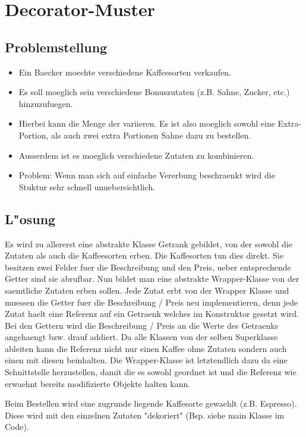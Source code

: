 \section{Decorator-Muster}

\subsection{Problemstellung}
\begin{itemize}
\item Ein Baecker moechte verschiedene Kaffeesorten verkaufen. 
\item Es soll moeglich sein verschiedene Bonuszutaten (z.B. Sahne, Zucker, etc.) hinzuzufuegen. 
\item Hierbei kann die Menge der variieren. Es ist also moeglich sowohl eine Extra-Portion, als auch 
  zwei extra Portionen Sahne dazu zu bestellen. 
\item Ausserdem ist es moeglich verschiedene Zutaten zu kombinieren. 
\item Problem: Wenn man sich auf einfache Vererbung beschraenkt wird die Stuktur sehr schnell 
  unuebersichtlich. 
\end{itemize}

\subsection{L"osung}
Es wird zu allererst eine abstrakte Klasse Getrank gebildet, von der sowohl die Zutaten als auch 
die Kaffeesorten erben. Die Kaffesorten tun dies direkt. Sie besitzen zwei Felder fuer die 
Beschreibung und den Preis, ueber entsprechende Getter sind sie abrufbar. Nun bildet man eine 
abstrakte Wrapper-Klasse von der saemtliche Zutaten erben sollen. Jede Zutat erbt von der Wrapper 
Klasse und muessen die Getter fuer die Beschreibung / Preis neu implementieren, denn jede Zutat 
haelt eine Referenz auf ein Getraenk welches im Konstruktor gesetzt wird. Bei den Gettern wird 
die Beschreibung / Preis an die Werte des Getraenks angehaengt bzw. drauf addiert. Da alle 
Klassen von der selben Superklasse ableiten kann die Referenz nicht nur einen Kaffee ohne Zutaten 
sondern auch einen mit diesen beinhalten. Die Wrapper-Klasse ist letztendlich dazu da eine 
Schnittstelle herzustellen, damit die es sowohl geordnet ist und die Referenz wie erwaehnt 
bereits modifizierte Objekte halten kann. 

Beim Bestellen wird eine zugrunde liegende Kaffesorte gewaehlt (z.B. Espresso). Diese wird mit 
den einzelnen Zutaten "dekoriert" (Bsp. siehe main Klasse im Code). 

